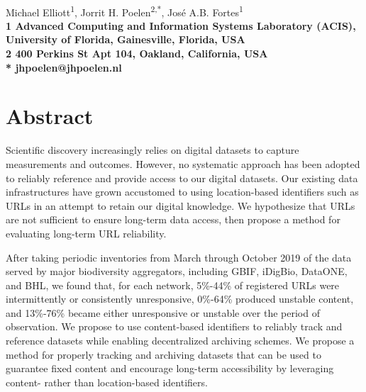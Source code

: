 \documentclass[10pt,letterpaper]{article}
\begin{document}
\vspace*{0.35in}

\begin{flushleft}
{\Large
\textbf{}
}
\newline
\\
Michael Elliott\textsuperscript{1},
Jorrit H. Poelen\textsuperscript{2,*},
José A.B. Fortes\textsuperscript{1}
\\
\bigskip
\bf{1} Advanced Computing and Information Systems Laboratory (ACIS), University of Florida, Gainesville, Florida, USA
\\
\bf{2} 400 Perkins St Apt 104, Oakland, California, USA
\\
\bigskip
* jhpoelen@jhpoelen.nl

\end{flushleft}

\linenumbers


\section*{Abstract}
Scientific discovery increasingly relies on digital datasets to capture measurements and outcomes. However, no systematic approach has been adopted to reliably reference and provide access to our digital datasets. Our existing data infrastructures have grown accustomed to using location-based identifiers such as URLs in an attempt to retain our digital knowledge. We hypothesize that URLs are not sufficient to ensure long-term data access, then propose a method for evaluating long-term URL reliability.

After taking periodic inventories from March through October 2019 of the data served by major biodiversity aggregators, including GBIF, iDigBio, DataONE, and BHL, we found that, for each network, 5\%-44\% of registered URLs were intermittently or consistently unresponsive, 0\%-64\% produced unstable content, and 13\%-76\% became either unresponsive or unstable over the period of observation. We propose to use content-based identifiers to reliably track and reference datasets while enabling decentralized archiving schemes. We propose a method for properly tracking and archiving datasets that can be used to guarantee fixed content and encourage long-term accessibility by leveraging content- rather than location-based identifiers.
\end{document}

